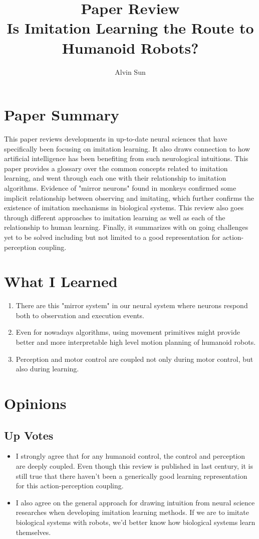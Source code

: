 \documentclass[10pt, twocolumn]{article}
\title{\vspace{-3.0em}Paper Review\\Is Imitation Learning the Route to Humanoid Robots?}
\author{Alvin Sun}
\begin{document}
\maketitle

\section{Paper Summary}
This paper reviews developments in up-to-date neural sciences that have specifically
been focusing on imitation learning. It also draws connection to how artificial
intelligence has been benefiting from such neurological intuitions. This paper
provides a glossary over the common concepts related to imitation learning,
and went through each one with their relationship to imitation algorithms.
Evidence of "mirror neurons" found in monkeys confirmed some implicit relationship
between observing and imitating, which further confirms the existence of imitation
mechanisms in biological systems. This review also goes through different approaches
to imitation learning as well as each of the relationship to human learning.
Finally, it summarizes with on going challenges yet to be solved including
but not limited to a good representation for action-perception coupling.

\section{What I Learned}
\begin{enumerate}
  \item There are this "mirror system" in our neural system where neurons respond
    both to observation and execution events.
  \item Even for nowadays algorithms, using movement primitives might provide better
    and more interpretable high level motion planning of humanoid robots.
  \item
    Perception and motor control are coupled not only during motor control, but
    also during learning.
\end{enumerate}

\section{Opinions}

\subsection{Up Votes}
\begin{itemize}
  \item I strongly agree that for any humanoid control, the control and perception
    are deeply coupled. Even though this review is published in last century,
    it is still true that there haven't been a generically good learning representation
    for this action-perception coupling.
  \item I also agree on the general approach for drawing intuition from neural
    science researches when developing imitation learning methods. If we are to
    imitate biological systems with robots, we'd better know how biological
    systems learn themselves.
\end{itemize}
\end{document}
